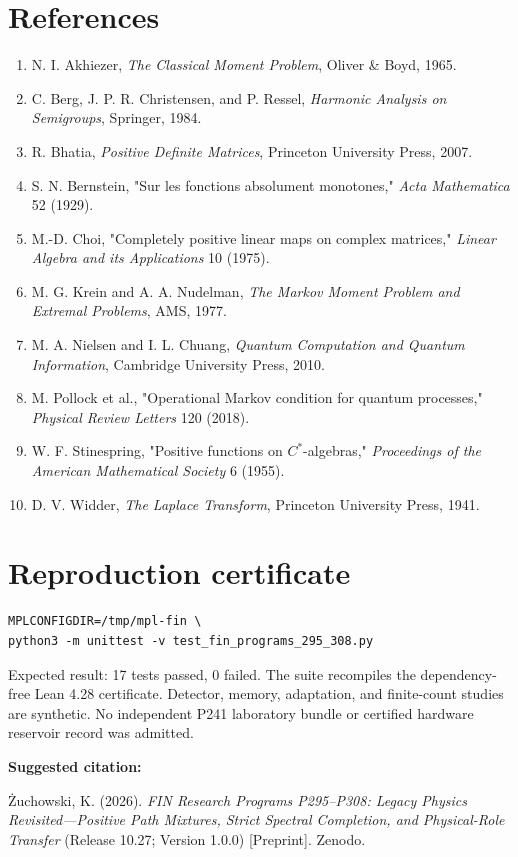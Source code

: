 \documentclass[11pt,a4paper,openany]{report}
\begin{document}
\chapter{References}

\begin{enumerate}
\item 
N. I. Akhiezer, \emph{The Classical Moment Problem}, Oliver \& Boyd, 1965.

\item 
C. Berg, J. P. R. Christensen, and P. Ressel, \emph{Harmonic Analysis on Semigroups}, Springer, 1984.

\item 
R. Bhatia, \emph{Positive Definite Matrices}, Princeton University Press, 2007.

\item 
S. N. Bernstein, "Sur les fonctions absolument monotones," \emph{Acta Mathematica} 52 (1929).

\item 
M.-D. Choi, "Completely positive linear maps on complex matrices," \emph{Linear Algebra and its Applications} 10 (1975).

\item 
M. G. Krein and A. A. Nudelman, \emph{The Markov Moment Problem and Extremal Problems}, AMS, 1977.

\item 
M. A. Nielsen and I. L. Chuang, \emph{Quantum Computation and Quantum Information}, Cambridge University Press, 2010.

\item 
M. Pollock et al., "Operational Markov condition for quantum processes," \emph{Physical Review Letters} 120 (2018).

\item 
W. F. Stinespring, "Positive functions on \(C^\ast\)-algebras," \emph{Proceedings of the American Mathematical Society} 6 (1955).

\item 
D. V. Widder, \emph{The Laplace Transform}, Princeton University Press, 1941.

\end{enumerate}


\clearpage
\chapter*{Reproduction certificate}
\begin{Verbatim}[fontsize=\small]
MPLCONFIGDIR=/tmp/mpl-fin \
python3 -m unittest -v test_fin_programs_295_308.py
\end{Verbatim}
Expected result: 17 tests passed, 0 failed.  The suite recompiles the
dependency-free Lean 4.28 certificate.  Detector, memory, adaptation, and
finite-count studies are synthetic.  No independent P241 laboratory bundle
or certified hardware reservoir record was admitted.

\medskip
\noindent\textbf{Suggested citation:}

\.Zuchowski, K. (2026). \emph{FIN Research Programs P295--P308:
Legacy Physics Revisited---Positive Path Mixtures, Strict Spectral
Completion, and Physical-Role Transfer} (Release 10.27; Version 1.0.0)
[Preprint]. Zenodo.
\end{document}
